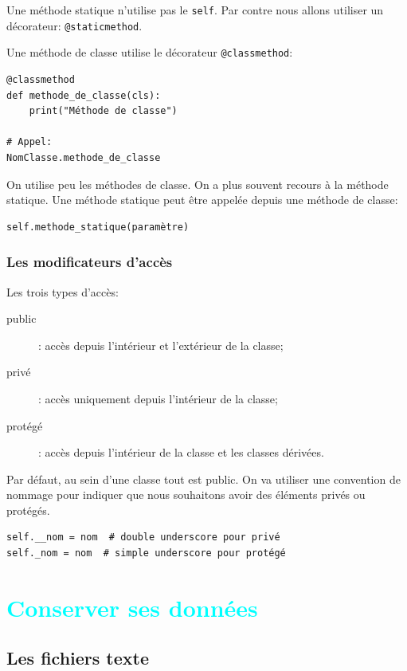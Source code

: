 \documentclass[a4paper,12pt]{book}
\begin{document}
Une méthode statique n'utilise pas le \texttt{self}. Par contre nous allons utiliser un décorateur: \texttt{@staticmethod}.

Une méthode de classe utilise le décorateur \texttt{@classmethod}:
\begin{lstlisting}
@classmethod
def methode_de_classe(cls):
    print("Méthode de classe")

# Appel:
NomClasse.methode_de_classe
\end{lstlisting}
\medskip

On utilise peu les méthodes de classe. On a plus souvent recours à la méthode statique. Une méthode statique peut être appelée depuis une méthode de classe:
\begin{lstlisting}
self.methode_statique(paramètre)
\end{lstlisting}
\medskip

\section{Les modificateurs d'accès}
Les trois types d'accès:
\begin{description}
	\item[public]: accès depuis l'intérieur et l'extérieur de la classe;
	\item[privé]: accès uniquement depuis l'intérieur de la classe;
	\item[protégé]: accès depuis l'intérieur de la classe et les classes dérivées.
\end{description}
\medskip

Par défaut, au sein d'une classe tout est public. On va utiliser une convention de nommage pour indiquer que nous souhaitons avoir des éléments privés ou protégés.
\begin{lstlisting}
self.__nom = nom  # double underscore pour privé
self._nom = nom  # simple underscore pour protégé
\end{lstlisting}
\medskip

\part{\textcolor{cyan}{Conserver ses données}}

\chapter{Les fichiers texte}
\end{document}
